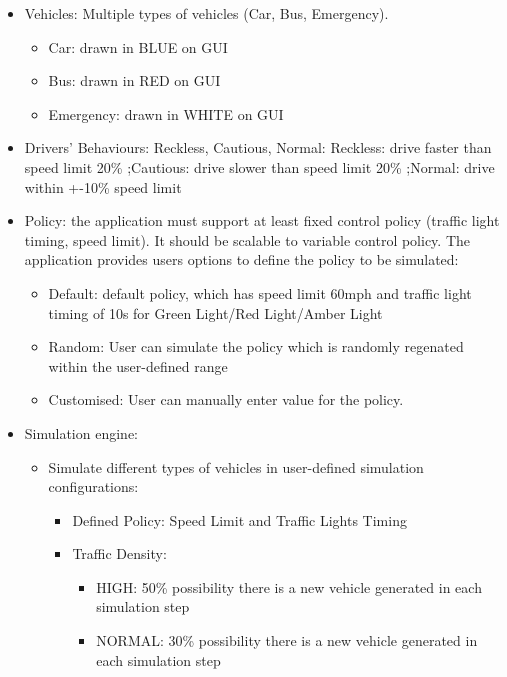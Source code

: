 \documentclass[11pt]{article}
\begin{document}
\begin{itemize}
\begin{itemize}
\begin{itemize}[noitemsep]
	
    	\end{itemize}

        \item Vehicles: Multiple types of vehicles (Car, Bus, Emergency). 
            \begin{itemize}
                \item Car: drawn in BLUE on GUI
                \item Bus: drawn in RED on GUI
                \item Emergency: drawn in WHITE on GUI
            \end{itemize}
       
        
        \item Drivers' Behaviours: Reckless, Cautious, Normal:
        Reckless: drive faster than speed limit 20\%
        ;Cautious: drive slower than speed limit 20\%
        ;Normal: drive within +-10\% speed limit
        
        \item Policy: the application must support at least fixed control policy (traffic light timing, speed limit). It should be scalable to variable control policy. The application provides users options to define the policy to be simulated:
            \begin{itemize}
                \item Default: default policy, which has speed limit 60mph and traffic light timing of 10s for Green Light/Red Light/Amber Light
                \item Random: User can simulate the policy which is randomly regenated within the user-defined range
                \item Customised: User can manually enter value for the policy.
            \end{itemize}

        \item Simulation engine: 
        \begin{itemize}
        
        \item Simulate different types of vehicles in user-defined simulation configurations:
            \begin{itemize}
            \item Defined Policy: Speed Limit and Traffic Lights Timing
            \item Traffic Density:
                \begin{itemize}
                \item HIGH: 50\% possibility there is a new vehicle generated in each simulation step
                 \item NORMAL: 30\% possibility there is a new vehicle generated in each simulation step
                

\end{itemize}
\end{itemize}
\end{itemize}
\end{itemize}
\end{itemize}
\end{document}
